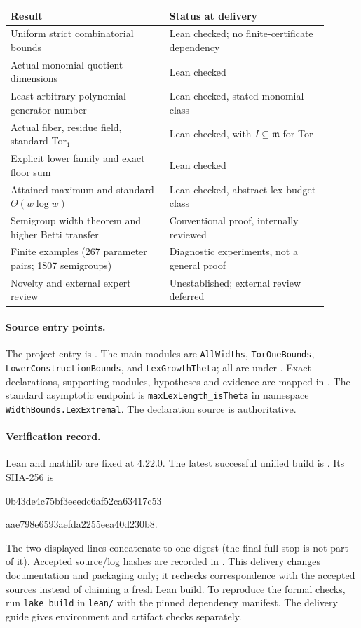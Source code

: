 \documentclass[11pt,a4paper]{article}
\begin{document}
\begin{center}
\small
\begin{tabular}{p{0.45\linewidth}p{0.45\linewidth}}
\hline
Result & Status at delivery\\ \hline
Uniform strict combinatorial bounds & Lean checked; no finite-certificate dependency\\
Actual monomial quotient dimensions & Lean checked\\
Least arbitrary polynomial generator number & Lean checked, stated monomial class\\
Actual fiber, residue field, standard Tor$_1$ & Lean checked, with $I\subseteq\mathfrak m$ for Tor\\
Explicit lower family and exact floor sum & Lean checked\\
Attained maximum and standard $\Theta(w\log w)$ & Lean checked, abstract lex budget class\\
Semigroup width theorem and higher Betti transfer & Conventional proof, internally reviewed\\
Finite examples (267 parameter pairs; 1807 semigroups) & Diagnostic experiments, not a general proof\\
Novelty and external expert review & Unestablished; external review deferred\\ \hline
\end{tabular}
\end{center}

\paragraph{Source entry points.}
{\raggedright
The project entry is . The main modules are
\texttt{AllWidths}, \texttt{TorOneBounds}, \texttt{LowerConstructionBounds},
and \texttt{LexGrowthTheta}; all are under .
Exact declarations, supporting modules, hypotheses and evidence are mapped in
. The standard asymptotic endpoint is
\texttt{maxLexLength\_isTheta} in namespace
\texttt{WidthBounds.LexExtremal}. The declaration source is authoritative.\par}

\paragraph{Verification record.}
Lean and mathlib are fixed at 4.22.0. The latest successful unified build is
. Its SHA-256 is
\begin{center}\footnotesize\ttfamily
0b43de4c75bf3eeedc6af52ca63417c53\par
aae798e6593aefda2255eea40d230b8.
\end{center}
The two displayed lines concatenate to one digest (the final full stop is not
part of it). Accepted source/log hashes are recorded in
. This delivery changes documentation and
packaging only; it rechecks correspondence with the accepted sources instead
of claiming a fresh Lean build. To reproduce the formal checks, run
\texttt{lake build} in \texttt{lean/} with the pinned dependency manifest.
The delivery guide gives environment and artifact checks separately.
\end{document}
